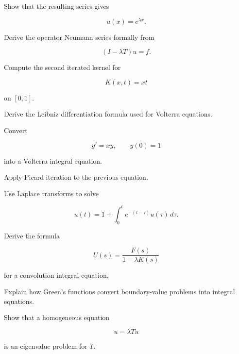 \begin{exercise}[3]
Show that the resulting series gives

\[
u(x)=e^{\lambda x}.
\]
\end{exercise}

\begin{exercise}[3]
Derive the operator Neumann series formally from

\[
(I-\lambda T)u=f.
\]
\end{exercise}

\begin{exercise}[3]
Compute the second iterated kernel for

\[
K(x,t)=xt
\]

on \([0,1]\).
\end{exercise}

\begin{exercise}[3]
Derive the Leibniz differentiation formula used for Volterra equations.
\end{exercise}

\begin{exercise}[3]
Convert

\[
y'=xy,
\qquad
y(0)=1
\]

into a Volterra integral equation.
\end{exercise}

\begin{exercise}[3]
Apply Picard iteration to the previous equation.
\end{exercise}

\begin{exercise}[3]
Use Laplace transforms to solve

\[
u(t)
=
1
+
\int_0^t
e^{-(t-\tau)}
u(\tau)\,d\tau.
\]
\end{exercise}

\begin{exercise}[3]
Derive the formula

\[
U(s)
=
\frac{
F(s)
}{
1-\lambda K(s)
}
\]

for a convolution integral equation.
\end{exercise}

\begin{exercise}[3]
Explain how Green's functions convert boundary-value problems into
integral equations.
\end{exercise}

\begin{exercise}[3]
Show that a homogeneous equation

\[
u=\lambda Tu
\]

is an eigenvalue problem for \(T\).
\end{exercise}

